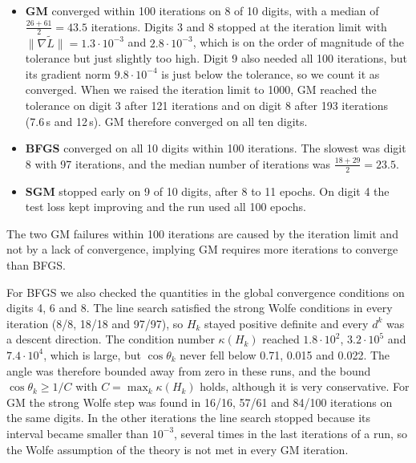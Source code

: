 \documentclass{article}
\begin{document}
\begin{itemize}
  \item \textbf{GM} converged within 100 iterations on 8 of 10 digits, with a median of $\frac{26+61}{2}=43.5$ iterations. Digits 3 and 8 stopped at the iteration limit with $\|\nabla\tilde L\|=1.3\cdot10^{-3}$ and $2.8\cdot10^{-3}$, which is on the order of magnitude of the tolerance but just slightly too high. Digit 9 also needed all 100 iterations, but its gradient norm $9.8\cdot10^{-4}$ is just below the tolerance, so we count it as converged. When we raised the iteration limit to 1000, GM reached the tolerance on digit 3 after 121 iterations and on digit 8 after 193 iterations (7.6\,s and 12\,s). GM therefore converged on all ten digits.
  \item \textbf{BFGS} converged on all 10 digits within 100 iterations. The slowest was digit 8 with 97 iterations, and the median number of iterations was $\frac{18+29}{2} = 23.5$.
  \item \textbf{SGM} stopped early on 9 of 10 digits, after 8 to 11 epochs. On digit 4 the test loss kept improving and the run used all 100 epochs.
\end{itemize}
The two GM failures within 100 iterations are caused by the iteration limit and not by a lack of convergence, implying GM requires more iterations to converge than BFGS.

For BFGS we also checked the quantities in the global convergence conditions on digits 4, 6 and 8. The line search satisfied the strong Wolfe conditions in every iteration (8/8, 18/18 and 97/97), so $H_k$ stayed positive definite and every $d^k$ was a descent direction. The condition number $\kappa(H_k)$ reached $1.8\cdot10^{2}$, $3.2\cdot10^{5}$ and $7.4\cdot10^{4}$, which is large, but $\cos\theta_k$ never fell below 0.71, 0.015 and 0.022. The angle was therefore bounded away from zero in these runs, and the bound $\cos\theta_k\ge 1/C$ with $C=\max_k\kappa(H_k)$ holds, although it is very conservative. For GM the strong Wolfe step was found in 16/16, 57/61 and 84/100 iterations on the same digits. In the other iterations the line search stopped because its interval became smaller than $10^{-3}$, several times in the last iterations of a run, so the Wolfe assumption of the theory is not met in every GM iteration.
\end{document}
